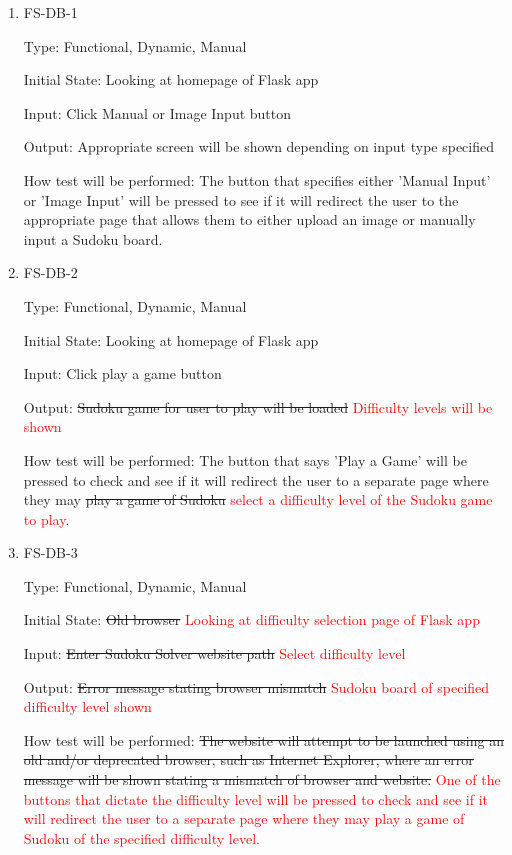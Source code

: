\documentclass[11pt]{article}
\begin{document}
\begin{enumerate}

\item{FS-DB-1\\}

Type: Functional, Dynamic, Manual
					
Initial State: Looking at homepage of Flask app
					
Input: Click Manual or Image Input button
					
Output: Appropriate screen will be shown depending on input type specified
					
How test will be performed: The button that specifies either 'Manual Input' or 'Image Input' will be pressed to see if it will redirect the user to the appropriate page that allows them to either upload an image or manually input a Sudoku board.
					
\item{FS-DB-2\\}

Type: Functional, Dynamic, Manual
					
Initial State: Looking at homepage of Flask app
					
Input: Click play a game button
					
Output: \sout{Sudoku game for user to play will be loaded} \textcolor{red}{Difficulty levels will be shown}
					
How test will be performed: The button that says 'Play a Game' will be pressed to check and see if it will redirect the user to a separate page where they may \sout{play a game of Sudoku} \textcolor{red}{select a difficulty level of the Sudoku game to play}.

\item{FS-DB-3\\}

Type: Functional, Dynamic, Manual
					
Initial State: \sout{Old browser} \textcolor{red}{Looking at difficulty selection page of Flask app}
					
Input: \sout{Enter Sudoku Solver website path} \textcolor{red}{Select difficulty level}
					
Output: \sout{Error message stating browser mismatch} \textcolor{red}{Sudoku board of specified difficulty level shown}
					
How test will be performed: \sout{The website will attempt to be launched using an old and/or deprecated browser, such as Internet Explorer, where an error message will be shown stating a mismatch of browser and website.} \textcolor{red}{One of the buttons that dictate the difficulty level will be pressed to check and see if it will redirect the user to a separate page where they may play a game of Sudoku of the specified difficulty level.}

\end{enumerate}
\end{document}
